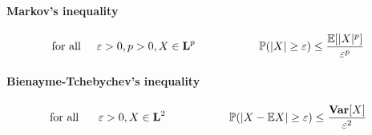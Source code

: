 \documentclass[a4paper,10pt]{article}
\begin{document}
\paragraph{Markov's inequality}
\[
\text{for all}\hspace{5mm} \varepsilon > 0, p>0, X\in \textbf{L}^p \hspace{20mm} \mathbb{P}(|X| \geq \varepsilon) \leq \frac{\mathbb{E}[|X|^p]}{\varepsilon ^p}
\]
\paragraph{Bienayme-Tchebychev's inequality}
\[
\text{for all  } \hspace{5mm} \varepsilon > 0, X\in \textbf{L}^2 \hspace{20mm} \mathbb{P}(|X- \mathbb{E}X| \geq \varepsilon) \leq \frac{\textbf{Var}[X]}{\varepsilon ^2}
\]


\end{document}
